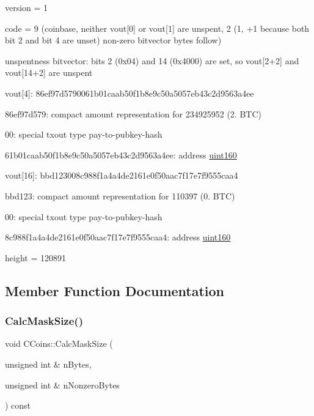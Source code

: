 \begin{DoxyItemize}
\item version = 1
\item code = 9 (coinbase, neither vout\mbox{[}0\mbox{]} or vout\mbox{[}1\mbox{]} are unspent, 2 (1, +1 because both bit 2 and bit 4 are unset) non-\/zero bitvector bytes follow)
\item unspentness bitvector\+: bits 2 (0x04) and 14 (0x4000) are set, so vout\mbox{[}2+2\mbox{]} and vout\mbox{[}14+2\mbox{]} are unspent
\item vout\mbox{[}4\mbox{]}\+: 86ef97d5790061b01caab50f1b8e9c50a5057eb43c2d9563a4ee
\begin{DoxyItemize}
\item 86ef97d579\+: compact amount representation for 234925952 (2. B\+TC)
\item 00\+: special txout type pay-\/to-\/pubkey-\/hash
\item 61b01caab50f1b8e9c50a5057eb43c2d9563a4ee\+: address \mbox{\hyperlink{classuint160}{uint160}}
\end{DoxyItemize}
\item vout\mbox{[}16\mbox{]}\+: bbd123008c988f1a4a4de2161e0f50aac7f17e7f9555caa4
\begin{DoxyItemize}
\item bbd123\+: compact amount representation for 110397 (0. B\+TC)
\item 00\+: special txout type pay-\/to-\/pubkey-\/hash
\item 8c988f1a4a4de2161e0f50aac7f17e7f9555caa4\+: address \mbox{\hyperlink{classuint160}{uint160}}
\end{DoxyItemize}
\item height = 120891 
\end{DoxyItemize}

\subsection{Member Function Documentation}
\mbox{\label{class_c_coins_a7fc7a42f2b5d7cf7476bfe3e10141e18}} 
\subsubsection{\texorpdfstring{Calc\+Mask\+Size()}{CalcMaskSize()}}
{\footnotesize\ttfamily void C\+Coins\+::\+Calc\+Mask\+Size (\begin{DoxyParamCaption}\item[{unsigned int \&}]{n\+Bytes,  }\item[{unsigned int \&}]{n\+Nonzero\+Bytes }\end{DoxyParamCaption}) const}

